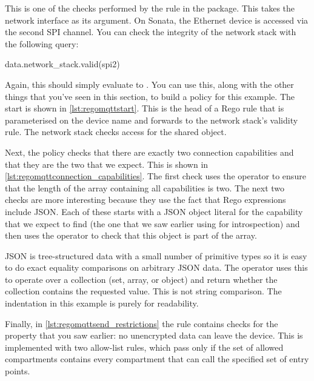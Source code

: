 {This is one of the checks performed by the  rule in the  package.
This takes the network interface as its argument.
On Sonata, the Ethernet device is accessed via the second SPI channel.
You can check the integrity of the network stack with the following query:

\begin{regosnippet}
data.network_stack.valid(spi2)
\end{regosnippet}

Again, this should simply evaluate to .
You can use this, along with the other things that you've seen in this section, to build a policy for this example.
The start is shown in \ref{lst:regomqttstart}.
This is the head of a Rego rule that is parameterised on the device name and forwards to the network stack's validity rule.
The network stack checks access for the shared object.

\regolisting[filename=examples/mqtt/mqtt.rego,marker=network_stack,label=lst:regomqttstart,caption="The start of the Rego policy for the MQTT example."]{}

Next, the policy checks that there are exactly two connection capabilities and that they are the two that we expect.
This is shown in \ref{lst:regomqttconnection_capabilities}.
The first check uses the  operator to ensure that the length of the array containing all capabilities is two.
The next two checks are more interesting because they use the fact that Rego expressions include JSON.
Each of these starts with a JSON object literal for the capability that we expect to find (the one that we saw earlier using  for introspection) and then uses the  operator to check that this object is part of the array.

JSON is tree-structured data with a small number of primitive types so it is easy to do exact equality comparisons on arbitrary JSON data.
The  operator uses this to operate over a collection (set, array, or object) and return whether the collection contains the requested value.
This is not string comparison.
The indentation in this example is purely for readability.

\regolisting[filename=examples/mqtt/mqtt.rego,marker=connection_capabilities,label=lst:regomqttconnection_capabilities,caption="Rego rules for restricting output in the MQTT example."]{}

Finally, in \ref{lst:regomqttsend_restrictions} the rule contains checks for the property that you saw earlier: no unencrypted data can leave the device.
This is implemented with two allow-list rules, which pass only if the set of allowed compartments contains every compartment that can call the specified set of entry points.

}
